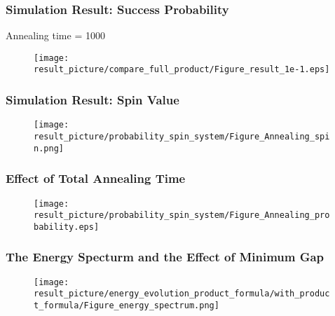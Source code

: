 \documentclass{beamer}
\begin{document}
\begin{frame}
	\frametitle{Simulation Result: Success Probability}
	Annealing time = 1000
	\begin{figure}
		\centering
		\texttt{[image: result\_picture/compare\_full\_product/Figure\_result\_1e-1.eps]}

	\end{figure}
\end{frame}

\begin{frame}
	\frametitle{Simulation Result: Spin Value}
	\begin{figure}
		\centering
		\texttt{[image: result\_picture/probability\_spin\_system/Figure\_Annealing\_spin.png]}
	\end{figure}
\end{frame}

\begin{frame}
	\frametitle{Effect of Total Annealing Time}
	\begin{figure}
		\centering
		\texttt{[image: result\_picture/probability\_spin\_system/Figure\_Annealing\_probability.eps]}
		
	\end{figure}
\end{frame}

\begin{frame}
	\frametitle{The Energy Specturm and the Effect of Minimum Gap}
	\begin{figure}
		\centering
		\texttt{[image: result\_picture/energy\_evolution\_product\_formula/with\_product\_formula/Figure\_energy\_spectrum.png]}
		
	\end{figure}
\end{frame}
\end{document}
